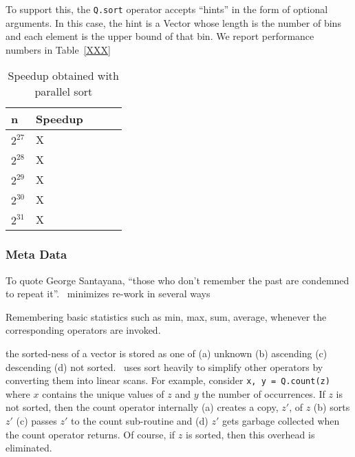 To support this, the {\tt Q.sort} operator accepts ``hints'' in the form of
optional arguments. In this case, the hint is a Vector whose length is the
number of bins and each element is the upper bound of that bin. We report
performance numbers in Table~\ref{XXX}

\begin{table}
\centering
\begin{tabular}{|l|l|l|l|l|} \hline \hline
  {\bf n} & {\bf Speedup} \\ \hline \hline
  \(2^{27}\) & X \\ \hline
  \(2^{28}\) & X \\ \hline
  \(2^{29}\) & X \\ \hline
  \(2^{30}\) & X \\ \hline
  \(2^{31}\) & X \\ \hline
  \hline
\end{tabular}
\caption{Speedup obtained with parallel sort}
\label{tbl_sort_speedup}
\end{table}

\subsubsection{Meta Data}

To quote George Santayana, ``those who don't remember the past are condemned to
repeat it''.  \Q\ minimizes re-work in several ways
\be
\item 
Remembering basic statistics such as min, max, sum, average, whenever the
corresponding operators are invoked. 
\item the sorted-ness of a vector is
stored as one of (a) unknown (b) ascending (c) descending (d) not sorted. \Q\
uses sort heavily to simplify other operators by converting them into linear
scans. For example, consider {\tt x, y  = Q.count(z)} where \(x\) contains the
unique values of \(z\) and \(y\) the number of occurrences. If \(z\) is not
sorted, then the count operator internally (a) creates a copy, \(z'\), of \(z\)
(b) sorts \(z'\) (c) passes \(z'\) to the count sub-routine and (d) \(z'\) gets
garbage collected when the count operator returns. Of course, if \(z\) is
sorted, then this overhead is eliminated.

\ee
